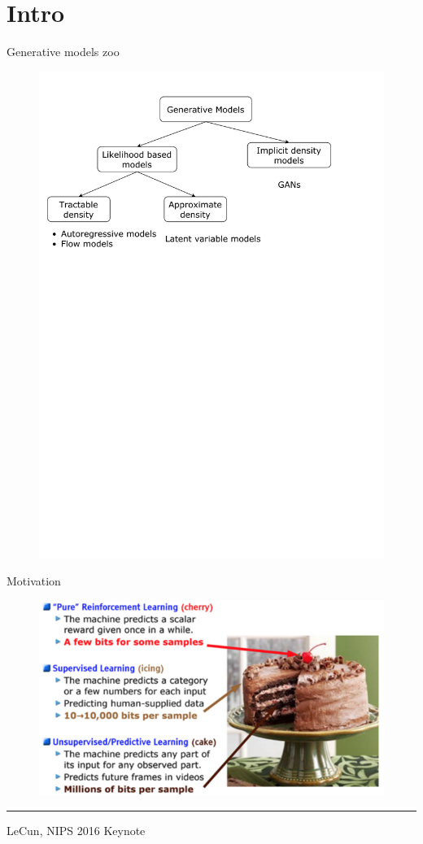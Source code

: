 \documentclass{beamer}
\begin{document}
\section{Intro}
\begin{frame}{Generative models zoo}
    \begin{figure}
        \centering
        \includegraphics[width=1.0\linewidth]{figs/generative_models_zoo.pdf}
        \label{fig:generative_models_zoo}
    \end{figure}
\end{frame}
\begin{frame}{Motivation}
    \begin{figure}
        \centering
        \includegraphics[width=\linewidth]{figs/unsupervised_cake.png}
        \label{fig:unsupervised_cake}
    \end{figure}
\vfill
\hrule\medskip
{\scriptsize LeCun, NIPS 2016 Keynote}
\end{frame}
\end{document}
